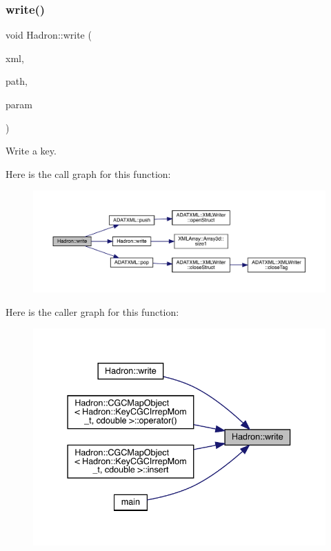 \subsubsection{\texorpdfstring{write()}{write()}\hspace{0.1cm}{\footnotesize\ttfamily [24/95]}}
{\footnotesize\ttfamily void Hadron\+::write (\begin{DoxyParamCaption}\item[{\mbox{\hyperlink{classADATXML_1_1XMLWriter}{X\+M\+L\+Writer}} \&}]{xml,  }\item[{const std\+::string \&}]{path,  }\item[{const \mbox{\hyperlink{structHadron_1_1KeyBaryonElementalOperator__t}{Key\+Baryon\+Elemental\+Operator\+\_\+t}} \&}]{param }\end{DoxyParamCaption})}



Write a key. 

Here is the call graph for this function\+:\nopagebreak
\begin{figure}[H]
\begin{center}
\leavevmode
\includegraphics[width=350pt]{d1/daf/namespaceHadron_ac358b1203bd94f6b26452402911ce174_cgraph}
\end{center}
\end{figure}
Here is the caller graph for this function\+:\nopagebreak
\begin{figure}[H]
\begin{center}
\leavevmode
\includegraphics[width=337pt]{d1/daf/namespaceHadron_ac358b1203bd94f6b26452402911ce174_icgraph}
\end{center}
\end{figure}
\mbox{\label{namespaceHadron_a4ae7852bf18d56cb1a966ce318245ea6}} 
